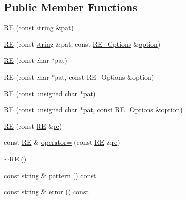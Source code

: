 \subsection*{Public Member Functions}
\begin{DoxyCompactItemize}
\item 
\hyperlink{classpcrecpp_1_1RE_acfac88de240b212e964a6e6dfb5c37b1}{RE} (const \hyperlink{pcre_8txt_ad52baeed02a03dda73cbe504945c9c35}{string} \&pat)
\item 
\hyperlink{classpcrecpp_1_1RE_a7b58ceac64e6f1df41c621ed56c4b3d0}{RE} (const \hyperlink{pcre_8txt_ad52baeed02a03dda73cbe504945c9c35}{string} \&pat, const \hyperlink{classpcrecpp_1_1RE__Options}{R\+E\+\_\+\+Options} \&\hyperlink{pcretest_8txt_a737bdf2e23a8aca3ce89e79e9df35b3e}{option})
\item 
\hyperlink{classpcrecpp_1_1RE_ae86a495e0e181a12fe5e1fdfb5536bd4}{RE} (const char $\ast$pat)
\item 
\hyperlink{classpcrecpp_1_1RE_a8aa4cfff1d28a291d189098d8dd60249}{RE} (const char $\ast$pat, const \hyperlink{classpcrecpp_1_1RE__Options}{R\+E\+\_\+\+Options} \&\hyperlink{pcretest_8txt_a737bdf2e23a8aca3ce89e79e9df35b3e}{option})
\item 
\hyperlink{classpcrecpp_1_1RE_a4327c372eac0a1317316e8f9c4e42c1a}{RE} (const unsigned char $\ast$pat)
\item 
\hyperlink{classpcrecpp_1_1RE_a3f0841866c5c6e50e667f73ea868f0cd}{RE} (const unsigned char $\ast$pat, const \hyperlink{classpcrecpp_1_1RE__Options}{R\+E\+\_\+\+Options} \&\hyperlink{pcretest_8txt_a737bdf2e23a8aca3ce89e79e9df35b3e}{option})
\item 
\hyperlink{classpcrecpp_1_1RE_a0e50fc020dc3856ce1be4b023b58e88c}{RE} (const \hyperlink{classpcrecpp_1_1RE}{RE} \&\hyperlink{pcre_8txt_abd134207f74532a8b094676c4a2ca9ed}{re})
\item 
const \hyperlink{classpcrecpp_1_1RE}{RE} \& \hyperlink{classpcrecpp_1_1RE_ae3fb857437a440eacd19c46312c19a6a}{operator=} (const \hyperlink{classpcrecpp_1_1RE}{RE} \&\hyperlink{pcre_8txt_abd134207f74532a8b094676c4a2ca9ed}{re})
\item 
\hyperlink{classpcrecpp_1_1RE_afa33d2d61abc56fc599d35f4c7f359c9}{$\sim$\+RE} ()
\item 
const \hyperlink{pcre_8txt_ad52baeed02a03dda73cbe504945c9c35}{string} \& \hyperlink{classpcrecpp_1_1RE_a079bfdf7ccde307823070621d203ab28}{pattern} () const 
\item 
const \hyperlink{pcre_8txt_ad52baeed02a03dda73cbe504945c9c35}{string} \& \hyperlink{classpcrecpp_1_1RE_ad592572a07c97f47bd29d5fb5f105fd1}{error} () const 

\end{DoxyCompactItemize}
